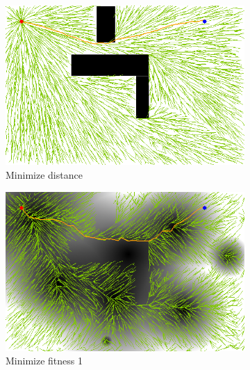 \documentclass[conference]{IEEEtran}
\begin{document}
\begin{figure}
	\centering
	\begin{subfigure}[b]{0.45\linewidth}
		\centering
		\includegraphics[width=\textwidth]{fig/sim4-obstacle/MORRTstar01-0.png}
		\caption{Minimize distance}
		\label{fig:sim:obs:distance}
	\end{subfigure}
	\begin{subfigure}[b]{0.45\linewidth}
		\centering
		\includegraphics[width=\textwidth]{fig/sim4-obstacle/MORRTstar01-1.png}
		\caption{Minimize fitness 1}
		\label{fig:sim:obs:fitness1}
	\end{subfigure}  \\
	\begin{subfigure}[b]{0.45\linewidth}
		\centering

\end{subfigure}
\end{figure}
\end{document}
